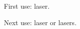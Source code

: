 \documentclass{article}
\begin{document}
First use: \gls{laser}.

Next use: \gls{laser} or \glspl{laser}.

\printglossaries
\end{document}
